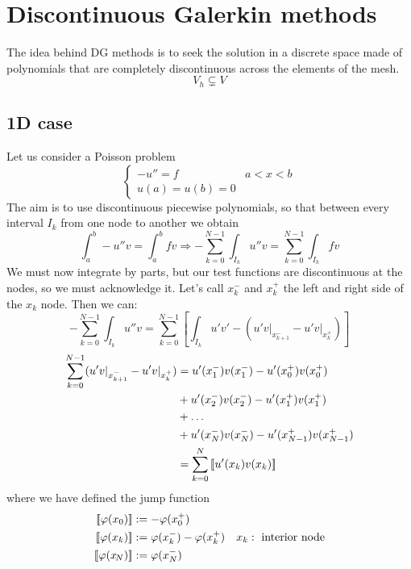 \newpage
\section{Discontinuous Galerkin methods}
The idea behind DG methods is to seek the solution in a discrete space made of polynomials that are completely discontinuous across the elements of the mesh.
\[
    V_h \subsetneq V
\]
\subsection{1D case}
Let us consider a Poisson problem 
\[
    \begin{cases}
        -u'' = f & a < x < b \\
        u(a) = u(b) = 0
    \end{cases}
\]
The aim is to use discontinuous piecewise polynomials, so that between every interval \(I_k\) from one node to another we obtain
\[
    \int_{a}^b -u''v = \int_a^b fv \Rightarrow - \sum_{k=0}^{N-1} \int_{I_k} u''v = \sum_{k=0}^{N-1} \int_{I_k} fv
\]
We must now integrate by parts, but our test functions are discontinuous at the nodes, so we must acknowledge it. Let's call \(x_k^-\) and \(x_k^+\) the left and right side of the \(x_k\) node. Then we can:
\begin{equation}
    -\sum_{k=0}^{N-1} \int_{I_k} u''v = \sum_{k=0}^{N-1} \left[ \int_{I_k}u'v' - \left( u'v\vert_{x_{k+1}^-} - u'v\vert_{x_k^+} \right) \right] \label{integration_by_parts_dg}
\end{equation}
    \begin{align}
    \sum_{k=0}^{N-1} (u'v\vert_{x_{k+1}^-} - u'v\vert_{x_k^+}) &= u'(x_1^-)v(x_1^-) - u'(x_0^+)v(x_0^+) \nonumber\\
    & + u'(x_2^-)v(x_2^-) - u'(x_1^+)v(x_1^+) \nonumber\\
    & + \ldots \\
    & + u'(x_N^-)v(x_N^-) - u'(x_{N-1}^+)v(x_{N-1}^+) \nonumber\\
    & = \sum_{k=0}^{N} \left[\!\left[u'(x_k)v(x_k)\right]\!\right] \nonumber \label{step_for_jump_dg}
\end{align}
where we have defined the jump function
\begin{align}
    \left[\!\left[\varphi(x_0)\right]\!\right] &:= -\varphi(x^+_0) & \nonumber\\
    \left[\!\left[\varphi(x_k)\right]\!\right] &:= \varphi(x_k^-) -\varphi(x^+_k) & x_k :\text{ interior node} \\
    \left[\!\left[\varphi(x_{\!N})\right]\!\right] &:= \varphi(x^-_N) &\nonumber \label{jump_function}
\end{align}
